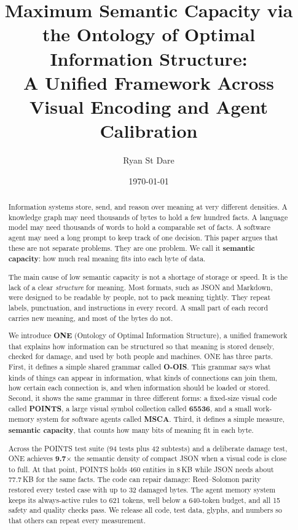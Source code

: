 \documentclass[11pt, a4paper]{article}
\title{Maximum Semantic Capacity via the Ontology of Optimal Information Structure:\\
       A Unified Framework Across Visual Encoding and Agent Calibration}
\author{Ryan St Dare}
\date{\today}
\begin{document}
\maketitle

\begin{abstract}
Information systems store, send, and reason over meaning at very different densities. A knowledge graph may need thousands of bytes to hold a few hundred facts. A language model may need thousands of words to hold a comparable set of facts. A software agent may need a long prompt to keep track of one decision. This paper argues that these are not separate problems. They are one problem. We call it \textbf{semantic capacity}: how much real meaning fits into each byte of data.

The main cause of low semantic capacity is not a shortage of storage or speed. It is the lack of a clear \textit{structure} for meaning. Most formats, such as JSON and Markdown, were designed to be readable by people, not to pack meaning tightly. They repeat labels, punctuation, and instructions in every record. A small part of each record carries new meaning, and most of the bytes do not.

We introduce \textbf{ONE} (Ontology of Optimal Information Structure), a unified framework that explains how information can be structured so that meaning is stored densely, checked for damage, and used by both people and machines. ONE has three parts. First, it defines a simple shared grammar called \textbf{O-OIS}. This grammar says what kinds of things can appear in information, what kinds of connections can join them, how certain each connection is, and when information should be loaded or stored. Second, it shows the same grammar in three different forms: a fixed-size visual code called \textbf{POINTS}, a large visual symbol collection called \textbf{65536}, and a small work-memory system for software agents called \textbf{MSCA}. Third, it defines a simple measure, \textbf{semantic capacity}, that counts how many bits of meaning fit in each byte.

Across the POINTS test suite (94 tests plus 42 subtests) and a deliberate damage test, ONE achieves \textbf{9.7$\times$} the semantic density of compact JSON when a visual code is close to full. At that point, POINTS holds 460 entities in 8\,KB while JSON needs about 77.7\,KB for the same facts. The code can repair damage: Reed--Solomon parity restored every tested case with up to 32 damaged bytes. The agent memory system keeps its always-active rules to 621 tokens, well below a 640-token budget, and all 15 safety and quality checks pass. We release all code, test data, glyphs, and numbers so that others can repeat every measurement.
\end{abstract}
\end{document}
